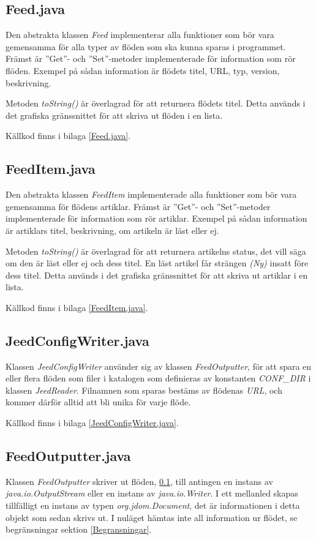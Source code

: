 \documentclass[titlepage, twoside, a4paper, 12pt]{article}
\begin{document}
\subsection{Feed.java}\label{Feed}
Den abstrakta klassen \textit{Feed} implementerar alla funktioner som
bör vara gemensamma för alla typer av flöden som ska kunna sparas i
programmet. Främst är ''Get''- och ''Set''-metoder implementerade för
information som rör flöden. Exempel på sådan information är flödets
titel, URL, typ, version, beskrivning.

Metoden \textit{toString()} är överlagrad för att returnera flödets
titel. Detta används i det grafiska gränssnittet för att skriva ut
flöden i en lista.

Källkod finns i bilaga \ref{Feed.java}.

\subsection{FeedItem.java}\label{FeedItem}
Den abstrakta klassen \textit{FeedItem} implementerade alla funktioner
som bör vara gemensamma för flödens artiklar. Främst är ''Get''- och
''Set''-metoder implementerade för information som rör
artiklar. Exempel på sådan information är artiklars titel,
beskrivning, om artikeln är läst eller ej.

Metoden \textit{toString()} är överlagrad för att returnera artikelns
status, det vill säga om den är läst eller ej och dess titel. En läst
artikel får strängen \textit{(Ny)} insatt före dess titel. Detta
används i det grafiska gränssnittet för att skriva ut artiklar i en
lista.

Källkod finns i bilaga \ref{FeedItem.java}.


\subsection{JeedConfigWriter.java}\label{JeedConfigWriter}
Klassen \textit{JeedConfigWriter} använder sig av klassen
\textit{FeedOutputter}, för att spara en eller flera flöden som filer
i katalogen som definieras av konstanten \textit{CONF\_DIR} i klassen
\textit{JeedReader}. Filnamnen som sparas bestäms av flödenas
\textit{URL}, och kommer därför alltid att bli unika för varje flöde.

Källkod finns i bilaga \ref{JeedConfigWriter.java}.

\subsection{FeedOutputter.java}\label{FeedOutputter}
Klassen \textit{FeedOutputter} skriver ut flöden, \ref{Feed}, till
antingen en instans av \textit{java.io.OutputStream} eller en instans
av \textit{java.io.Writer}. I ett mellanled skapas tillfälligt en
instans av typen \textit{org.jdom.Document}, det är informationen i
detta objekt som sedan skrivs ut. I nuläget hämtas inte all
information ur flödet, se begränsningar sektion
\ref{Begransningar}. %
\end{document}
